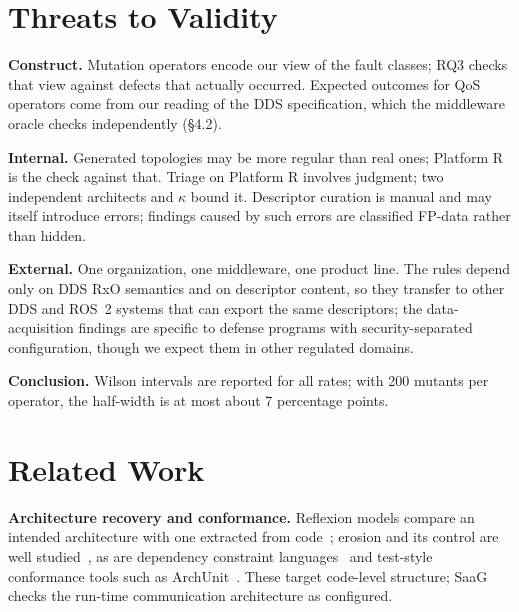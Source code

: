 \documentclass[sigconf,screen]{acmart}
\begin{document}
\section{Threats to Validity}

\noindent\textbf{Construct.} Mutation operators encode our view of the fault classes; RQ3 checks that view against defects that actually occurred. Expected outcomes for QoS operators come from our reading of the DDS specification, which the middleware oracle checks independently (\S4.2).

\noindent\textbf{Internal.} Generated topologies may be more regular than real ones; Platform R is the check against that. Triage on Platform R involves judgment; two independent architects and $\kappa$ bound it. Descriptor curation is manual and may itself introduce errors; findings caused by such errors are classified FP-data rather than hidden.

\noindent\textbf{External.} One organization, one middleware, one product line. The rules depend only on DDS RxO semantics and on descriptor content, so they transfer to other DDS and ROS~2 systems that can export the same descriptors; the data-acquisition findings are specific to defense programs with security-separated configuration, though we expect them in other regulated domains.

\noindent\textbf{Conclusion.} Wilson intervals are reported for all rates; with 200 mutants per operator, the half-width is at most about 7 percentage points.

\section{Related Work}

\noindent\textbf{Architecture recovery and conformance.} Reflexion models compare an intended architecture with one extracted from code~\cite{murphy2001}; erosion and its control are well studied~\cite{perry1992,desilva2012}, as are dependency constraint languages~\cite{terra2014} and test-style conformance tools such as ArchUnit~\cite{archunit}. These target code-level structure; SaaG checks the run-time communication architecture as configured.
\end{document}
